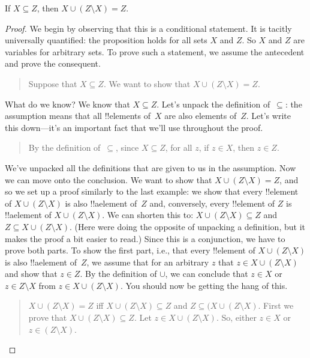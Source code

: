 \documentclass[../../../include/open-logic-section]{subfiles}
\begin{document}


\begin{prop}
If $X \subseteq Z$, then $X \cup (Z \setminus X) = Z$.
\end{prop}  

\begin{proof}
We begin by observing that this is a conditional statement. It is
tacitly universally quantified: the proposition holds for all sets $X$
and $Z$. So $X$ and $Z$ are variables for arbitrary sets. To prove
such a statement, we assume the antecedent and prove the consequent.

\begin{quote}  
Suppose that $X \subseteq Z$. We want to show that $X \cup (Z \setminus
X) = Z$.
\end{quote}

What do we know? We know that $X \subseteq Z$. Let's unpack the
definition of~$\subseteq$: the assumption means that all !!{element}s
of~$X$ are also elements of~$Z$. Let's write this down---it's an
important fact that we'll use throughout the proof.

\begin{quote}
By the definition of~$\subseteq$, since $X \subseteq Z$, for all $z$,
if $z \in X$, then $z \in Z$.
\end{quote}

We've unpacked all the definitions that are given to us in the
assumption. Now we can move onto the conclusion. We want to show that
$X \cup (Z \setminus X) = Z$, and so we set up a proof similarly to
the last example: we show that every !!{element} of $X \cup (Z
\setminus X)$ is also !!a{element} of~$Z$ and, conversely, every
!!{element} of $Z$ is !!a{element} of $X \cup (Z \setminus X)$. We can
shorten this to: $X \cup (Z \setminus X) \subseteq Z$ and $Z \subseteq
X \cup (Z \setminus X)$. (Here were doing the opposite of unpacking a
definition, but it makes the proof a bit easier to read.)  Since this
is a conjunction, we have to prove both parts. To show the first part,
i.e., that every !!{element} of $X \cup (Z \setminus X)$ is also
!!a{element} of~$Z$, we assume that for an arbitrary $z$ that $z \in X
\cup (Z \setminus X)$ and show that $z \in Z$. By the definition of
$\cup$, we can conclude that $z \in X$ or $z \in Z \setminus X$ from
$z \in X \cup (Z \setminus X)$. You should now be getting the hang of
this.

\begin{quote}
$X \cup (Z \setminus X) = Z$ iff $X \cup (Z \setminus X) \subseteq Z$
  and $Z \subseteq (X \cup (Z \setminus X)$.  First we prove that $X
  \cup (Z \setminus X) \subseteq Z$.  Let $z \in X \cup (Z \setminus
  X)$. So, either $z \in X$ or $z \in (Z \setminus X)$.
\end{quote}


\end{proof}
\end{document}
